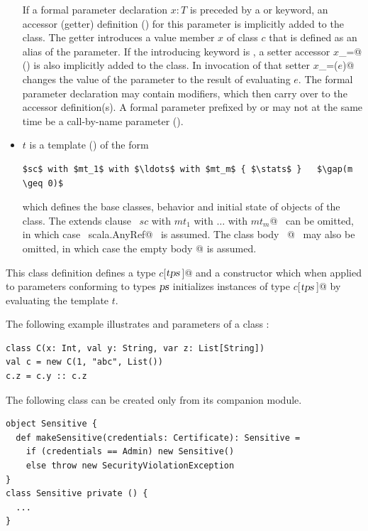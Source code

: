\begin{itemize}
If a formal parameter declaration $x: T$ is preceded by a 
or  keyword, an accessor (getter) definition
() for this parameter is implicitly added to the
class. The getter introduces a value member $x$ of class $c$ that is
defined as an alias of the parameter. If the introducing keyword is
, a setter accessor \lstinline@$x$_=@ () is also
implicitly added to the class. In invocation of that setter \lstinline@$x$_=($e$)@
changes the value of the parameter to the result of evaluating $e$.
The formal parameter declaration may contain modifiers, which then
carry over to the accessor definition(s). A formal parameter prefixed
by  or  may not at the same time be a call-by-name
parameter ().
\item[] 
$t$ is a
template () of the form
\begin{lstlisting}
$sc$ with $mt_1$ with $\ldots$ with $mt_m$ { $\stats$ }   $\gap(m \geq 0)$
\end{lstlisting}
which defines the base classes, behavior and initial state of objects of
the class. The extends clause ~\lstinline@extends $sc$ with $mt_1$ with $\ldots$ with $mt_m$@~ 
can be omitted, in which case
~\lstinline@extends scala.AnyRef@~ is assumed.  The class body
~\lstinline@{$\stats\,$}@~ may also be omitted, in which case the empty body
\lstinline@{}@ is assumed.
\end{itemize}
This class definition defines a type \lstinline@$c$[$\mbox{\sl tps}\,$]@ and a constructor
which when applied to parameters conforming to types $\mbox{\sl ps}$
initializes instances of type \lstinline@$c$[$\mbox{\sl tps}\,$]@ by evaluating the template
$t$.

\example The following example illustrates  and 
parameters of a class :
\begin{lstlisting}
class C(x: Int, val y: String, var z: List[String])
val c = new C(1, "abc", List())
c.z = c.y :: c.z
\end{lstlisting}

\example\label{ex:private-constr}
The following class can be created only from its companion
module.
\begin{lstlisting}
object Sensitive {
  def makeSensitive(credentials: Certificate): Sensitive = 
    if (credentials == Admin) new Sensitive() 
    else throw new SecurityViolationException
}
class Sensitive private () {
  ...
}
\end{lstlisting}


